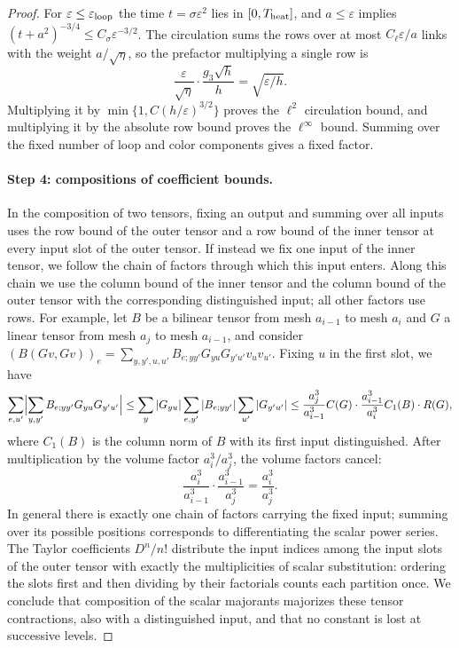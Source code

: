 \begin{proof}
For $\varepsilon\le\varepsilon_{\rm loop}$ the time $t=\sigma\varepsilon^2$ lies in $[0,T_{\rm heat}]$, and $a\le\varepsilon$ implies $(t+a^2)^{-3/4}\le C_\sigma\varepsilon^{-3/2}$. The circulation sums the rows over at most $C_\ell\varepsilon/a$ links with the weight $a/\sqrt\eta$, so the prefactor multiplying a single row is
\[
 \frac{\varepsilon}{\sqrt\eta}\cdot\frac{g_3\sqrt h}{h}=\sqrt{\varepsilon/h}.
\]
Multiplying it by $\min\{1,C(h/\varepsilon)^{3/2}\}$ proves the $\ell^2$ circulation bound, and multiplying it by the absolute row bound proves the $\ell^\infty$ bound. Summing over the fixed number of loop and color components gives a fixed factor.

\paragraph{Step 4: compositions of coefficient bounds.}
In the composition of two tensors, fixing an output and summing over all inputs uses the row bound of the outer tensor and a row bound of the inner tensor at every input slot of the outer tensor. If instead we fix one input of the inner tensor, we follow the chain of factors through which this input enters. Along this chain we use the column bound of the inner tensor and the column bound of the outer tensor with the corresponding distinguished input; all other factors use rows. For example, let $B$ be a bilinear tensor from mesh $a_{i-1}$ to mesh $a_i$ and $G$ a linear tensor from mesh $a_j$ to mesh $a_{i-1}$, and consider $(B(Gv,Gv))_e=\sum_{y,y',u,u'}B_{e;yy'}G_{yu}G_{y'u'}v_uv_{u'}$. Fixing $u$ in the first slot, we have
\[
 \sum_{e,u'}\Bigl|\sum_{y,y'}B_{e;yy'}G_{yu}G_{y'u'}\Bigr|\le\sum_y|G_{yu}|\sum_{e,y'}|B_{e;yy'}|\sum_{u'}|G_{y'u'}|\le\frac{a_j^3}{a_{i-1}^3}C(G)\cdot\frac{a_{i-1}^3}{a_i^3}C_1(B)\cdot R(G),
\]
where $C_1(B)$ is the column norm of $B$ with its first input distinguished. After multiplication by the volume factor $a_i^3/a_j^3$, the volume factors cancel:
\[
 \frac{a_i^3}{a_{i-1}^3}\cdot\frac{a_{i-1}^3}{a_j^3}=\frac{a_i^3}{a_j^3}.
\]
In general there is exactly one chain of factors carrying the fixed input; summing over its possible positions corresponds to differentiating the scalar power series. The Taylor coefficients $D^n/n!$ distribute the input indices among the input slots of the outer tensor with exactly the multiplicities of scalar substitution: ordering the slots first and then dividing by their factorials counts each partition once. We conclude that composition of the scalar majorants majorizes these tensor contractions, also with a distinguished input, and that no constant is lost at successive levels.


\end{proof}
